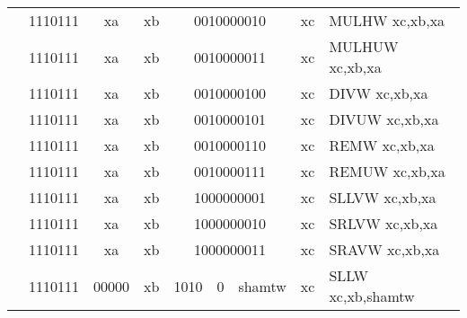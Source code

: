 \begin{table}[p]
\begin{small}
\begin{center}
\begin{tabular}{rcccccccccl}
&
\multicolumn{2}{|c|}{1110111} &
\multicolumn{1}{c|}{xa} &
\multicolumn{1}{c|}{xb} &
\multicolumn{4}{c|}{0010000010} &
\multicolumn{1}{c|}{xc} & MULHW xc,xb,xa \\
\cline{2-10}
  

&
\multicolumn{2}{|c|}{1110111} &
\multicolumn{1}{c|}{xa} &
\multicolumn{1}{c|}{xb} &
\multicolumn{4}{c|}{0010000011} &
\multicolumn{1}{c|}{xc} & MULHUW xc,xb,xa \\
\cline{2-10}
  

&
\multicolumn{2}{|c|}{1110111} &
\multicolumn{1}{c|}{xa} &
\multicolumn{1}{c|}{xb} &
\multicolumn{4}{c|}{0010000100} &
\multicolumn{1}{c|}{xc} & DIVW xc,xb,xa \\
\cline{2-10}
  

&
\multicolumn{2}{|c|}{1110111} &
\multicolumn{1}{c|}{xa} &
\multicolumn{1}{c|}{xb} &
\multicolumn{4}{c|}{0010000101} &
\multicolumn{1}{c|}{xc} & DIVUW xc,xb,xa \\
\cline{2-10}
  

&
\multicolumn{2}{|c|}{1110111} &
\multicolumn{1}{c|}{xa} &
\multicolumn{1}{c|}{xb} &
\multicolumn{4}{c|}{0010000110} &
\multicolumn{1}{c|}{xc} & REMW xc,xb,xa \\
\cline{2-10}
  

&
\multicolumn{2}{|c|}{1110111} &
\multicolumn{1}{c|}{xa} &
\multicolumn{1}{c|}{xb} &
\multicolumn{4}{c|}{0010000111} &
\multicolumn{1}{c|}{xc} & REMUW xc,xb,xa \\
\cline{2-10}
  

&
\multicolumn{2}{|c|}{1110111} &
\multicolumn{1}{c|}{xa} &
\multicolumn{1}{c|}{xb} &
\multicolumn{4}{c|}{1000000001} &
\multicolumn{1}{c|}{xc} & SLLVW xc,xb,xa \\
\cline{2-10}
  

&
\multicolumn{2}{|c|}{1110111} &
\multicolumn{1}{c|}{xa} &
\multicolumn{1}{c|}{xb} &
\multicolumn{4}{c|}{1000000010} &
\multicolumn{1}{c|}{xc} & SRLVW xc,xb,xa \\
\cline{2-10}
  

&
\multicolumn{2}{|c|}{1110111} &
\multicolumn{1}{c|}{xa} &
\multicolumn{1}{c|}{xb} &
\multicolumn{4}{c|}{1000000011} &
\multicolumn{1}{c|}{xc} & SRAVW xc,xb,xa \\
\cline{2-10}
  

&
\multicolumn{2}{|c|}{1110111} &
\multicolumn{1}{c|}{00000} &
\multicolumn{1}{c|}{xb} &
\multicolumn{2}{c|}{1010} &
\multicolumn{1}{c|}{0} &
\multicolumn{1}{c|}{shamtw} &
\multicolumn{1}{c|}{xc} & SLLW xc,xb,shamtw \\
\cline{2-10}
  


\end{tabular}
\end{center}
\end{small}
\end{table}
